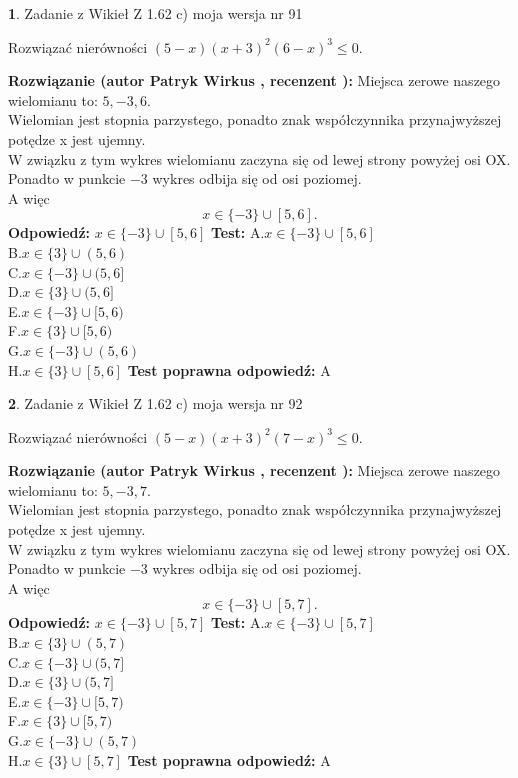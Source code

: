 \documentclass[12pt, a4paper]{article}
\theoremstyle{definition} %
\newtheorem{zad}{}
\newcommand{\zadStart}[1]{\begin{zad}#1\newline}
\newcommand{\zadStop}{\end{zad}}
\newcommand{\rozwStart}[2]{\noindent \textbf{Rozwiązanie (autor #1 , recenzent #2): }\newline}
\newcommand{\rozwStop}{\newline}
\newcommand{\odpStart}{\noindent \textbf{Odpowiedź:}\newline}
\newcommand{\odpStop}{\newline}
\newcommand{\testStart}{\noindent \textbf{Test:}\newline}
\newcommand{\testStop}{\newline}
\newcommand{\kluczStart}{\noindent \textbf{Test poprawna odpowiedź:}\newline}
\newcommand{\kluczStop}{\newline}
\begin{document}
\zadStart{Zadanie z Wikieł Z 1.62 c) moja wersja nr 91}

Rozwiązać nierówności $(5-x)(x+3)^{2}(6-x)^{3}\le0$.
\zadStop
\rozwStart{Patryk Wirkus}{}
Miejsca zerowe naszego wielomianu to: $5, -3, 6$.\\
Wielomian jest stopnia parzystego, ponadto znak współczynnika przy\linebreak najwyższej potędze x jest ujemny.\\ W związku z tym wykres wielomianu zaczyna się od lewej strony powyżej osi OX.\\
Ponadto w punkcie $-3$ wykres odbija się od osi poziomej.\\
A więc $$x \in \{-3\} \cup [5,6].$$
\rozwStop
\odpStart
$x \in \{-3\} \cup [5,6]$
\odpStop
\testStart
A.$x \in \{-3\} \cup [5,6]$\\
B.$x \in \{3\} \cup (5,6)$\\
C.$x \in \{-3\} \cup (5,6]$\\
D.$x \in \{3\} \cup (5,6]$\\
E.$x \in \{-3\} \cup [5,6)$\\
F.$x \in \{3\} \cup [5,6)$\\
G.$x \in \{-3\} \cup (5,6)$\\
H.$x \in \{3\} \cup [5,6]$
\testStop
\kluczStart
A
\kluczStop



\zadStart{Zadanie z Wikieł Z 1.62 c) moja wersja nr 92}

Rozwiązać nierówności $(5-x)(x+3)^{2}(7-x)^{3}\le0$.
\zadStop
\rozwStart{Patryk Wirkus}{}
Miejsca zerowe naszego wielomianu to: $5, -3, 7$.\\
Wielomian jest stopnia parzystego, ponadto znak współczynnika przy\linebreak najwyższej potędze x jest ujemny.\\ W związku z tym wykres wielomianu zaczyna się od lewej strony powyżej osi OX.\\
Ponadto w punkcie $-3$ wykres odbija się od osi poziomej.\\
A więc $$x \in \{-3\} \cup [5,7].$$
\rozwStop
\odpStart
$x \in \{-3\} \cup [5,7]$
\odpStop
\testStart
A.$x \in \{-3\} \cup [5,7]$\\
B.$x \in \{3\} \cup (5,7)$\\
C.$x \in \{-3\} \cup (5,7]$\\
D.$x \in \{3\} \cup (5,7]$\\
E.$x \in \{-3\} \cup [5,7)$\\
F.$x \in \{3\} \cup [5,7)$\\
G.$x \in \{-3\} \cup (5,7)$\\
H.$x \in \{3\} \cup [5,7]$
\testStop
\kluczStart
A
\kluczStop
\end{document}

